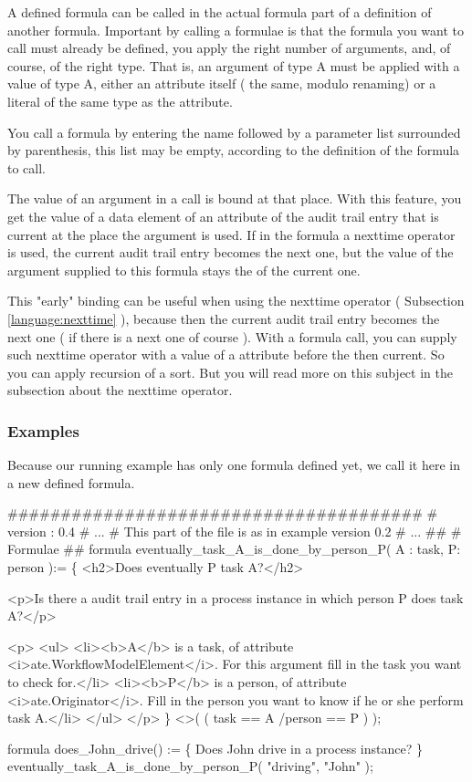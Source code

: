 A defined formula can be called in the actual formula part of a definition of
another formula. Important by calling a formulae is that the formula you want to
call must already be defined, you apply the right number of arguments, and, of
course, of the right type. That is, an argument of type A must be applied with
a value of type A, either an attribute itself ( the same, modulo renaming) or
a literal of the same type as the attribute.

You call a formula by entering the name followed by a parameter list surrounded
by parenthesis, this list may be empty, according to the definition of the
formula to call.

The value of an argument in a call is bound at that place. With this feature,
you get the value of a data element of an attribute of the audit trail entry
that is current at the place the argument is used. If in the formula a
nexttime operator is used, the current audit trail entry becomes the next one,
but the value of the argument supplied to this formula stays the of the
current one. 

This "early" binding can be useful when using the nexttime operator
( Subsection \ref{language:nexttime} ), because then the current audit
trail entry becomes the next one ( if there is a next one of course ). With a
formula call, you can supply such nexttime operator with a value of a
attribute before the then current. So you can apply recursion of a sort. But
you will read more on this subject in the subsection about the nexttime
operator.

\subsubsection{Examples}

Because our running example has only one formula defined yet, we call it here
in a new defined formula.

\begin{ltlcode}
#######################################
# version : 0.4
# ... 
# This part of the file is as in example version 0.2
# ...
##
# Formulae
##
formula eventually_task_A_is_done_by_person_P( A : task, P: person ):=
\{
  <h2>Does eventually P task A?</h2>

    <p>Is there a audit trail entry in a process instance in which person P
    does task A?</p>

    <p>
      <ul>
        <li><b>A</b> is a task, of attribute <i>ate.WorkflowModelElement</i>.
        For this argument fill in the task you want to check for.</li>
        <li><b>P</b> is a person, of attribute <i>ate.Originator</i>. Fill in
        the person you want to know if he or she perform task A.</li>
      </ul>
    </p>
\}
  <>( ( task == A /\bs person == P ) );

formula does_John_drive() := 
\{ Does John drive in a process instance? \}
  eventually_task_A_is_done_by_person_P( "driving", "John" );
\end{ltlcode}

